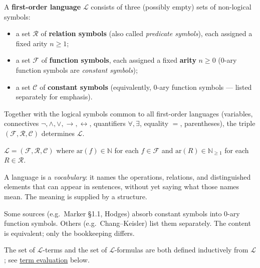 \begin{tcolorbox}[colback=propbox, colframe=propborder, arc=2pt,
  left=6pt, right=6pt, top=4pt, bottom=4pt,
  title={\small\textbf{Definition (First-Order Language $\mathcal{L}$)}},
  fonttitle=\small\bfseries]
\label{def:first-order-language}
A \textbf{first-order language} $\mathcal{L}$ consists of three (possibly
empty) sets of non-logical symbols:
\begin{itemize}
  \item a set $\mathcal{R}$ of \textbf{relation symbols} (also called
        \emph{predicate symbols}), each assigned a fixed arity $n \geq 1$;
  \item a set $\mathcal{F}$ of \textbf{function symbols}, each assigned a
        fixed \textbf{arity} $n \geq 0$ (0-ary function symbols are
        \emph{constant symbols});
  \item a set $\mathcal{C}$ of \textbf{constant symbols} (equivalently,
        0-ary function symbols — listed separately for emphasis).
\end{itemize}
Together with the logical symbols common to all first-order languages
(variables, connectives $\lnot, \land, \lor, \to, \leftrightarrow$,
quantifiers $\forall, \exists$, equality $=$, parentheses), the triple
$(\mathcal{F}, \mathcal{R}, \mathcal{C})$ determines $\mathcal{L}$.
\end{tcolorbox}

\begin{remark*}
$\mathcal{L} = (\mathcal{F}, \mathcal{R}, \mathcal{C})$ where
$\mathrm{ar}(f) \in \mathbb{N}$ for each $f \in \mathcal{F}$ and
$\mathrm{ar}(R) \in \mathbb{N}_{\geq 1}$ for each $R \in \mathcal{R}$.
\end{remark*}

\begin{remark*}[Intuition]
A language is a \emph{vocabulary}: it names the operations, relations, and
distinguished elements that can appear in sentences, without yet saying what
those names mean. The meaning is supplied by a structure.
\end{remark*}

\begin{remark*}
Some sources (e.g.\ Marker \S1.1, Hodges) absorb constant symbols into
0-ary function symbols. Others (e.g.\ Chang--Keisler) list them separately.
The content is equivalent; only the bookkeeping differs.
\end{remark*}

\begin{remark*}[Consequence]
The set of $\mathcal{L}$-terms and the set of $\mathcal{L}$-formulas are
both defined inductively from $\mathcal{L}$; see
\hyperref[def:term-evaluation]{term evaluation} below.
\end{remark*}

